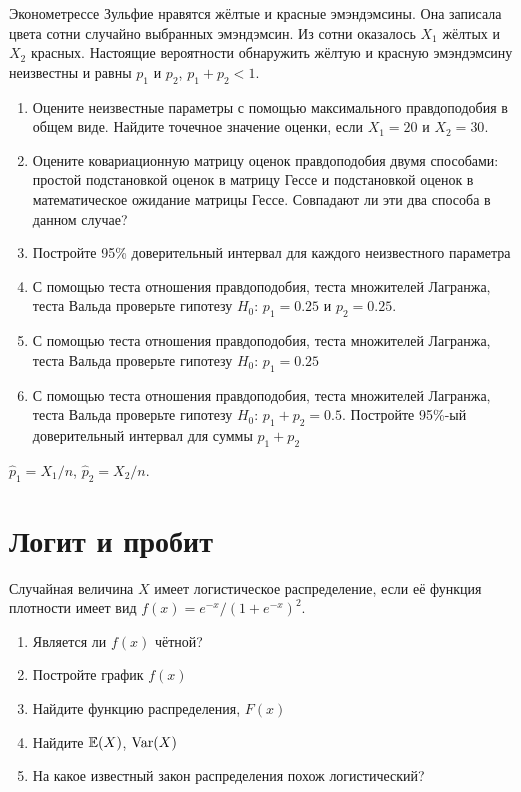 \documentclass[pdftex,11pt,openany]{book}\usepackage[]{graphicx}\usepackage[]{color}
\begin{document}
\begin{problem}
\useR Эконометрессе Зульфие нравятся жёлтые и красные эмэндэмсины. Она записала цвета сотни случайно выбранных эмэндэмсин. Из сотни оказалось $X_1$ жёлтых и $X_2$ красных. Настоящие вероятности обнаружить жёлтую и красную эмэндэмсину неизвестны и равны $p_1$ и $p_2$, $p_1+p_2<1$.

\begin{enumerate}
\item Оцените неизвестные параметры с помощью максимального правдоподобия в общем виде. Найдите точечное значение оценки, если $X_1=20$ и $X_2=30$.
\item Оцените ковариационную матрицу оценок правдоподобия двумя способами: простой подстановкой оценок в матрицу Гессе и подстановкой оценок в математическое ожидание матрицы Гессе. Совпадают ли эти два способа в данном случае?
\item Постройте 95\% доверительный интервал для каждого неизвестного параметра
\item С помощью теста отношения правдоподобия, теста множителей Лагранжа, теста Вальда проверьте гипотезу $H_0$: $p_1=0.25$ и $p_2=0.25$.
\item С помощью теста отношения правдоподобия, теста множителей Лагранжа, теста Вальда проверьте гипотезу $H_0$: $p_1=0.25$ 
\item С помощью теста отношения правдоподобия, теста множителей Лагранжа, теста Вальда проверьте гипотезу $H_0$: $p_1+p_2=0.5$. Постройте 95\%-ый доверительный интервал для суммы $p_1+p_2$
\end{enumerate}

\end{problem}

\begin{solution}
$\hat{p}_1=X_1/n$, $\hat{p}_2=X_2/n$.
\end{solution}




\chapter{Логит и пробит}




\begin{problem}
Случайная величина $X$ имеет логистическое распределение, если её функция плотности имеет вид $f(x)=e^{-x}/(1+e^{-x})^2$.
\begin{enumerate}
\item Является ли $f(x)$ чётной?
\item Постройте график $f(x)$
\item Найдите функцию распределения, $F(x)$
\item Найдите $\mathbb{E}(X)$, $\operatorname{Var}(X)$
\item На какое известный закон распределения похож логистический?
\end{enumerate}
\end{problem}
\end{document}

